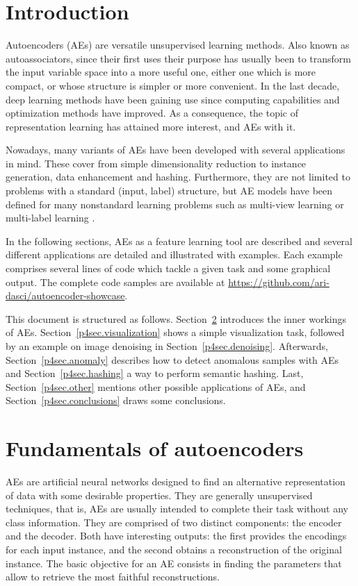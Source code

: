 \section{Introduction}

Autoencoders (AEs) \cite{hinton} are versatile unsupervised learning methods. Also known as autoassociators, since their first uses their purpose has usually been to transform the input variable space into a more useful one, either one which is more compact, or whose structure is simpler or more convenient. In the last decade, deep learning methods have been gaining use since computing capabilities and optimization methods have improved. As a consequence, the topic of representation learning \cite{bengio} has attained more interest, and AEs with it.

Nowadays, many variants of AEs \cite{charte} have been developed with several applications in mind. These cover from simple dimensionality reduction to instance generation, data enhancement and hashing. Furthermore, they are not limited to problems with a standard (input, label) structure, but AE models have been defined for many nonstandard learning problems such as multi-view learning or multi-label learning \cite{nonstandard,advcae,maniac}.

In the following sections, AEs as a feature learning tool are described and several different applications are detailed and illustrated with examples. Each example comprises several lines of code which tackle a given task and some graphical output. The complete code samples are available at \url{https://github.com/ari-dasci/autoencoder-showcase}.

This document is structured as follows. Section~\ref{p4sec.fundamentals} introduces the inner workings of AEs. Section~\ref{p4sec.visualization} shows a simple visualization task, followed by an example on image denoising in Section~\ref{p4sec.denoising}. Afterwards, Section~\ref{p4sec.anomaly} describes how to detect anomalous samples with AEs and Section~\ref{p4sec.hashing} a way to perform semantic hashing. Last, Section~\ref{p4sec.other} mentions other possible applications of AEs, and Section~\ref{p4sec.conclusions} draws some conclusions.

\section{Fundamentals of autoencoders}
\label{p4sec.fundamentals}

AEs are artificial neural networks designed to find an alternative representation of data with some desirable properties. They are generally unsupervised techniques, that is, AEs are usually intended to complete their task without any class information. They are comprised of two distinct components: the encoder and the decoder. Both have interesting outputs: the first provides the encodings for each input instance, and the second obtains a reconstruction of the original instance. The basic objective for an AE consists in finding the parameters that allow to retrieve the most faithful reconstructions.

